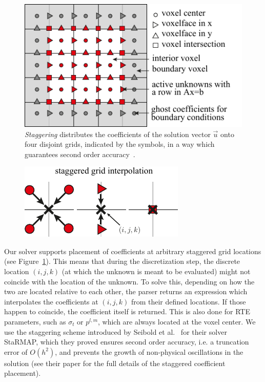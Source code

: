 \documentclass{egpubl}
\newcommand{\icaption}[1]{\caption{#1}}
\begin{document}
\begin{figure}[h]

\centering
\includegraphics[width=0.8\columnwidth]{fig_staggered_grids_small.pdf}
\icaption{\emph{Staggering} distributes the coefficients of the solution vector $\vec{u}$ onto four disjoint grids, indicated by the symbols, in a way which guarantees second order accuracy~\cite{Seibold14}.\vspace{-.2in}}
\label{fig:staggeredgrid}
\end{figure}

\begin{figure}
\hspace{-.1in}
\includegraphics[width=0.6\columnwidth]{fig_staggered_interpolation_small.pdf}
\vspace{-.25in}
\end{figure}Our solver supports placement of coefficients at arbitrary staggered grid locations (see Figure~\ref{fig:staggeredgrid}). This means that during the discretization step, the discrete location $(i, j, k)$ (at which the unknown is meant to be evaluated) might not coincide with the location of the unknown. To solve this, depending on how the two are located relative to each other, the parser returns an expression which interpolates the coefficients at $(i, j, k)$ from their defined locations. If those happen to coincide, the coefficient itself is returned. This is also done for RTE parameters, such as $\sigma_t$ or $p^{l,m}$, which are always located at the voxel center. We use the staggering scheme introduced by Seibold et al.~\cite{Seibold14} for their solver \textsf{StaRMAP}, which they proved ensures second order accuracy, i.e. a truncation error of $O(h^2)$, and prevents the growth of non-physical oscillations in the solution (see their paper for the full details of the staggered coefficient placement).
\end{document}

